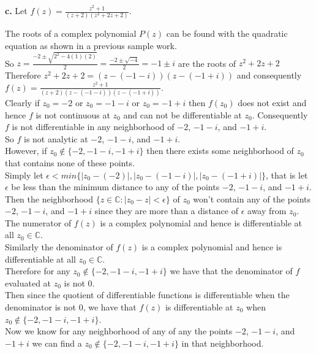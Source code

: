 \documentclass{article}
\begin{document}
{\Large\textbf{c.}} Let $f(z) =\frac{z^2 + 1}{(z + 2)(z^2 + 2z + 2)}$.
\begin{center}
    \doublespacing
    The roots of a complex polynomial $P(z)$ can be found with the quadratic equation as shown in a previous sample work.
    \\So $z =\frac{-2\pm\sqrt{2^2 - 4(1)(2)}}{2} =\frac{-2\pm\sqrt{-4}}{2} = -1\pm i$ are the roots of $z^2 + 2z + 2$
    \\Therefore $z^2 + 2z + 2 = (z - (-1 - i))(z - (-1 + i))$ and consequently $f(z) =\frac{z^2 + 1}{(z + 2)(z - (-1 - i))(z - (-1 + i))}$.
    \\Clearly if $z_0 = -2$ or $z_0 = -1 - i$ or $z_0 = -1 + i$ then $f(z_0)$ does not exist and hence $f$ is not continuous at $z_0$ and can not be differentiable at $z_0$. Consequently $f$ is not differentiable in any neighborhood of $-2$, $-1 - i$, and $-1 + i$.
    \\So $f$ is not analytic at $-2$, $-1 - i$, and $-1 + i$.
    \break
    \\However, if $z_0\notin\{-2, -1 - i, -1 + i\}$ then there exists some neighborhood of $z_0$ that contains none of these points.
    \\Simply let $\epsilon < min\{|z_0 - (-2)|, |z_0 - (-1 - i)|, |z_0 - (-1 + i)|\}$, that is let $\epsilon$ be less than the minimum distance to any of the points $-2$, $-1 - i$, and $-1 + i$.
    \\Then the neighborhood $\{z\in\mathbb{C} :|z_0 - z| <\epsilon\}$ of $z_0$ won't contain any of the points $-2$, $-1 - i$, and $-1 + i$ since they are more than a distance of $\epsilon$ away from $z_0$.
    \\The numerator of $f(z)$ is a complex polynomial and hence is differentiable at all $z_0\in\mathbb{C}$.
    \\Similarly the denominator of $f(z)$ is a complex polynomial and hence is differentiable at all $z_0\in\mathbb{C}$.
    \\Therefore for any $z_0\notin\{-2, -1 - i, -1 + i\}$ we have that the denominator of $f$ evaluated at $z_0$ is not 0.
    \\Then since the quotient of differentiable functions is differentiable when the denominator is not 0, we have that $f(z)$ is differentiable at $z_0$ when $z_0\notin\{-2, -1 - i, -1 + i\}$.
    \break
    \\Now we know for any neighborhood of any of any the points $-2$, $-1 - i$, and $-1 + i$ we can find a $z_0\notin\{-2, -1 - i, -1 + i\}$ in that neighborhood.

\end{center}
\end{document}
